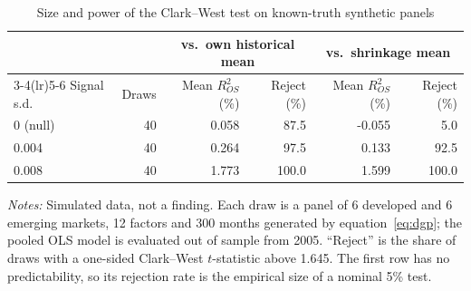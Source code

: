 \begin{table}[!ht]
\centering
\caption{Size and power of the Clark--West test on known-truth synthetic panels}
\label{tab:sizepower}
\begin{tabular}{lrrrrr}
\toprule
 & & \multicolumn{2}{c}{vs.\ own historical mean} & \multicolumn{2}{c}{vs.\ shrinkage mean} \\
\cmidrule(lr){3-4}\cmidrule(lr){5-6}
Signal s.d. & Draws & Mean $R^2_{OS}$ (\%) & Reject (\%) & Mean $R^2_{OS}$ (\%) & Reject (\%) \\
\midrule
0 (null) & 40 & 0.058 & 87.5 & -0.055 & 5.0 \\
0.004 & 40 & 0.264 & 97.5 & 0.133 & 92.5 \\
0.008 & 40 & 1.773 & 100.0 & 1.599 & 100.0 \\
\bottomrule
\end{tabular}

\vspace{4pt}
\begin{minipage}{0.92\linewidth}\footnotesize
\textit{Notes:} Simulated data, not a finding. Each draw is a panel of 6 developed and 6 emerging
markets, 12 factors and 300 months generated by equation~\eqref{eq:dgp}; the pooled OLS model is
evaluated out of sample from 2005. ``Reject'' is the share of draws with a one-sided Clark--West
$t$-statistic above 1.645. The first row has no predictability, so its rejection rate is the
empirical size of a nominal 5\% test.
\end{minipage}
\end{table}
